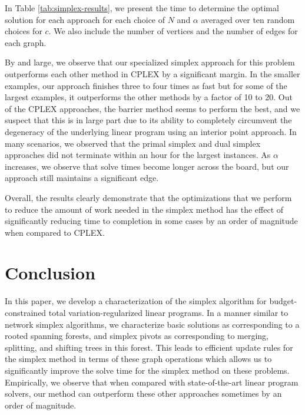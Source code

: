 \documentclass[titlepage,11pt]{article}
\begin{document}
In Table \ref{tab:simplex-results}, we present the time to determine the optimal solution for each approach for each choice of $N$ and $\alpha$ averaged over ten random choices for $c$. We also include the number of vertices and the number of edges for each graph.

By and large, we observe that our specialized simplex approach for this problem outperforms each other method in CPLEX by a significant margin. In the smaller examples, our approach finishes three to four times as fast but for some of the largest examples, it outperforms the other methods by a factor of 10 to 20. Out of the CPLEX approaches, the barrier method seems to perform the best, and we suspect that this is in large part due to its ability to completely circumvent the degeneracy of the underlying linear program using an interior point approach. In many scenarios, we observed that the primal simplex and dual simplex approaches did not terminate within an hour for the largest instances. As $\alpha$ increases, we observe that solve times become longer across the board, but our approach still maintains a significant edge.

Overall, the results clearly demonstrate that the optimizations that we perform to reduce the amount of work needed in the simplex method has the effect of significantly reducing time to completion in some cases by an order of magnitude when compared to CPLEX.




\section{Conclusion}
In this paper, we develop a characterization of the simplex algorithm for budget-constrained total variation-regularized linear programs. In a manner similar to network simplex algorithms, we characterize basic solutions as corresponding to a rooted spanning forests, and simplex pivots as corresponding to merging, splitting, and shifting trees in this forest. This leads to efficient update rules for the simplex method in terms of these graph operations which allows us to significantly improve the solve time for the simplex method on these problems. Empirically, we observe that when compared with state-of-the-art linear program solvers, our method can outperform these other approaches sometimes by an order of magnitude.
\end{document}
